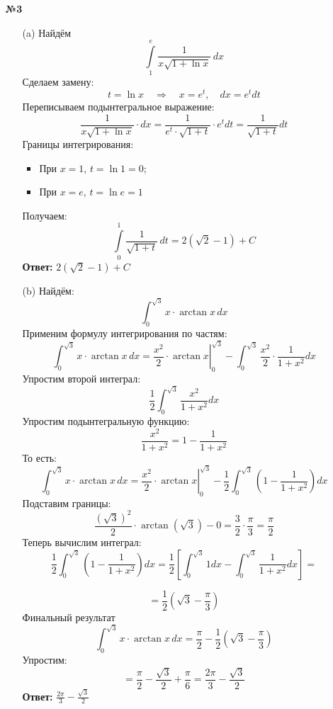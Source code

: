 \documentclass[a4paper]{article}
\begin{document}
\begin{enumerate}
    \item[\textbf{№3}]\begin{enumerate}
        \item[(a)] Найдём
        \[
        \int\limits_1^e \frac{1}{x \sqrt{1 + \ln x}} \, dx
        \]
        Сделаем замену:
        \[
        t = \ln x \quad \Rightarrow \quad x = e^t, \quad dx = e^t dt
        \]
        Переписываем подынтегральное выражение:
        \[
        \frac{1}{x \sqrt{1 + \ln x}} \cdot dx = \frac{1}{e^t \cdot \sqrt{1 + t}} \cdot e^t dt = \frac{1}{\sqrt{1 + t}} dt
        \]
        Границы интегрирования:
        \begin{itemize}
            \item 
            При \( x = 1 \), \( t = \ln 1 = 0 \);  
            \item
            При \( x = e \), \( t = \ln e = 1 \)
        \end{itemize}

        Получаем:
        \[
        \int\limits_0^1 \frac{1}{\sqrt{1 + t}} \, dt = 2(\sqrt{2} - 1) + C
        \]
        \textbf{Ответ: } $ 2(\sqrt{2} - 1) + C$\\

        \item[(b)]Найдём:
        \[
        \int_0^{\sqrt{3}} x \cdot \arctan x \, dx
        \]
        Применим формулу интегрирования по частям:
        \[
        \int_0^{\sqrt{3}} x \cdot \arctan x \, dx = \left. \frac{x^2}{2} \cdot \arctan x \right|_0^{\sqrt{3}} - \int_0^{\sqrt{3}} \frac{x^2}{2} \cdot \frac{1}{1 + x^2} dx
        \]
        Упростим второй интеграл:
        \[
        \frac{1}{2} \int_0^{\sqrt{3}} \frac{x^2}{1 + x^2} dx
        \]
        Упростим подынтегральную функцию:
        \[
        \frac{x^2}{1 + x^2} = 1 - \frac{1}{1 + x^2}
        \]
        То есть:
        \[
        \int_0^{\sqrt{3}} x \cdot \arctan x \, dx = \left. \frac{x^2}{2} \cdot \arctan x \right|_0^{\sqrt{3}} - \frac{1}{2} \int_0^{\sqrt{3}} \left(1 - \frac{1}{1 + x^2}\right) dx
        \]
        Подставим границы:
        \[
        \frac{(\sqrt{3})^2}{2} \cdot \arctan(\sqrt{3}) - 0 = \frac{3}{2} \cdot \frac{\pi}{3} = \frac{\pi}{2}
        \]
        Теперь вычислим интеграл:
        \[
        \frac{1}{2} \int_0^{\sqrt{3}} \left(1 - \frac{1}{1 + x^2}\right) dx = \frac{1}{2} \left[ \int_0^{\sqrt{3}} 1 dx - \int_0^{\sqrt{3}} \frac{1}{1 + x^2} dx \right]=
        \]

        \[
        =\frac{1}{2} \left( \sqrt{3} - \frac{\pi}{3} \right)
        \]
        Финальный результат
        \[
        \int_0^{\sqrt{3}} x \cdot \arctan x \, dx = \frac{\pi}{2} - \frac{1}{2} \left( \sqrt{3} - \frac{\pi}{3} \right)
        \]
        Упростим:
        \[
        = \frac{\pi}{2} - \frac{\sqrt{3}}{2} + \frac{\pi}{6} = \frac{2\pi}{3} - \frac{\sqrt{3}}{2}
        \]
        \textbf{Ответ: } $\frac{2\pi}{3} - \frac{\sqrt{3}}{2}$\\


\end{enumerate}
\end{enumerate}
\end{document}
